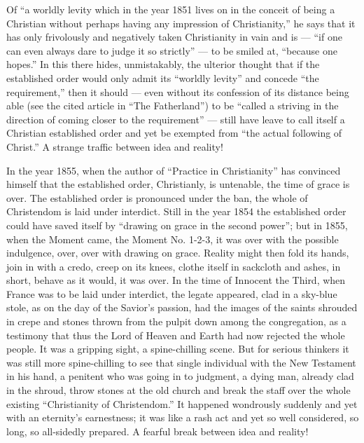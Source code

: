 \documentclass[12pt,a4paper,openany]{book}
\newcommand{\opage}[1]{\marginnote{\footnotesize\textit{[#1]}}}
\begin{document}
Of ``a worldly levity which in the year 1851
lives on in the conceit of being a Christian without perhaps
having any impression of Christianity,'' he says
that it has only frivolously and negatively taken Christianity
in vain and is --- ``if one can even always dare to
judge it so strictly'' --- to be smiled at, ``because one
\setcounter{footnote}{0}%
\opage{23}hopes.'' In this there hides, unmistakably, the ulterior thought
that if the established order would only admit its
``worldly levity'' and concede ``the requirement,'' then
it should --- even without its confession of its
distance being able (see the cited article in ``The Fatherland'') to be ``called
a striving in the direction of coming closer to the requirement''
--- still have leave to call itself a Christian
established order and yet be exempted from ``the actual
following of Christ.'' A strange traffic between idea
and reality!

In the year 1855, when the author of ``Practice in Christianity''
has convinced himself that the established order, Christianly,
is untenable, the time of grace is over. The established order
is pronounced under the ban, the whole of Christendom is laid under
interdict. Still in the year 1854 the established order
could have saved itself by ``drawing on grace in the second power'';
but in 1855, when the Moment came, the Moment No. 1-2-3,
it was over with the possible indulgence, over, over with
drawing on grace. Reality might then fold
its hands, join in with a credo, creep on its knees, clothe
itself in sackcloth and ashes, in short, behave as it would, it
was over. In the time of Innocent the Third, when France
was to be laid under interdict, the legate appeared,
clad in a sky-blue stole, as on the day of the Savior's
passion, had the images of the saints shrouded in crepe and
stones thrown from the pulpit down among the congregation,
as a testimony that thus the Lord of Heaven and
Earth had now rejected the whole people. It was a
gripping sight, a spine-chilling scene. But for
serious thinkers it was still more spine-chilling
to see that single individual with the New Testament
\setcounter{footnote}{0}%
\opage{24}in his hand, a penitent who was going in to judgment,
a dying man, already clad in the shroud, throw stones at
the old church and break the staff over the whole existing
``Christianity of Christendom.'' It happened wondrously
suddenly and yet with an eternity's earnestness; it was like
a rash act and yet so well considered, so long, so
all-sidedly prepared. A fearful break between idea and reality!
\end{document}
